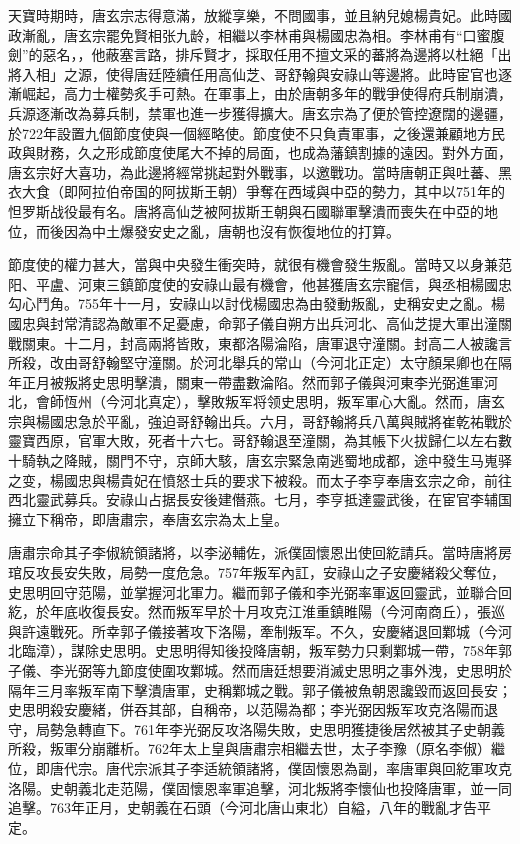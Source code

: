 天寶時期時，唐玄宗志得意滿，放縱享樂，不問國事，並且納兒媳楊貴妃。此時國政漸亂，唐玄宗罷免賢相张九龄，相繼以李林甫與楊國忠為相。李林甫有“口蜜腹劍”的惡名，，他蔽塞言路，排斥賢才，採取任用不擅文采的蕃將為邊將以杜絕「出將入相」之源，使得唐廷陸續任用高仙芝、哥舒翰與安祿山等邊將。此時宦官也逐漸崛起，高力士權勢炙手可熱。在軍事上，由於唐朝多年的戰爭使得府兵制崩潰，兵源逐漸改為募兵制，禁軍也進一步獲得擴大。唐玄宗為了便於管控遼闊的邊疆，於722年設置九個節度使與一個經略使。節度使不只負責軍事，之後還兼顧地方民政與財務，久之形成節度使尾大不掉的局面，也成為藩鎮割據的遠因。對外方面，唐玄宗好大喜功，為此邊將經常挑起對外戰事，以邀戰功。當時唐朝正與吐蕃、黑衣大食（即阿拉伯帝国的阿拔斯王朝）爭奪在西域與中亞的勢力，其中以751年的怛罗斯战役最有名。唐將高仙芝被阿拔斯王朝與石國聯軍擊潰而喪失在中亞的地位，而後因為中土爆發安史之亂，唐朝也沒有恢復地位的打算。

節度使的權力甚大，當與中央發生衝突時，就很有機會發生叛亂。當時又以身兼范阳、平盧、河東三鎮節度使的安祿山最有機會，他甚獲唐玄宗寵信，與丞相楊國忠勾心鬥角。755年十一月，安祿山以討伐楊國忠為由發動叛亂，史稱安史之亂。楊國忠與封常清認為敵軍不足憂慮，命郭子儀自朔方出兵河北、高仙芝提大軍出潼關戰關東。十二月，封高兩將皆敗，東都洛陽淪陷，唐軍退守潼關。封高二人被讒言所殺，改由哥舒翰堅守潼關。於河北舉兵的常山（今河北正定）太守顏杲卿也在隔年正月被叛將史思明擊潰，關東一帶盡數淪陷。然而郭子儀與河東李光弼進軍河北，會師恆州（今河北真定），擊敗叛军将领史思明，叛军軍心大亂。然而，唐玄宗與楊國忠急於平亂，強迫哥舒翰出兵。六月，哥舒翰將兵八萬與賊將崔乾祐戰於靈寶西原，官軍大敗，死者十六七。哥舒翰退至潼關，為其帳下火拔歸仁以左右數十騎執之降賊，關門不守，京師大駭，唐玄宗緊急南逃蜀地成都，途中發生马嵬驿之变，楊國忠與楊貴妃在憤怒士兵的要求下被殺。而太子李亨奉唐玄宗之命，前往西北靈武募兵。安祿山占据長安後建僭燕。七月，李亨抵達靈武後，在宦官李辅国擁立下稱帝，即唐肅宗，奉唐玄宗為太上皇。

唐肅宗命其子李俶統領諸將，以李泌輔佐，派僕固懷恩出使回紇請兵。當時唐將房琯反攻長安失敗，局勢一度危急。757年叛军內訌，安祿山之子安慶緒殺父奪位，史思明回守范陽，並掌握河北軍力。繼而郭子儀和李光弼率軍返回靈武，並聯合回紇，於年底收復長安。然而叛军早於十月攻克江淮重鎮睢陽（今河南商丘），張巡與許遠戰死。所幸郭子儀接著攻下洛陽，牽制叛军。不久，安慶緒退回鄴城（今河北臨漳），謀除史思明。史思明得知後投降唐朝，叛军勢力只剩鄴城一帶，758年郭子儀、李光弼等九節度使圍攻鄴城。然而唐廷想要消滅史思明之事外洩，史思明於隔年三月率叛军南下擊潰唐軍，史稱鄴城之戰。郭子儀被魚朝恩讒毀而返回長安；史思明殺安慶緒，併吞其部，自稱帝，以范陽為都；李光弼因叛军攻克洛陽而退守，局勢急轉直下。761年李光弼反攻洛陽失敗，史思明獲捷後居然被其子史朝義所殺，叛軍分崩離析。762年太上皇與唐肅宗相繼去世，太子李豫（原名李俶）繼位，即唐代宗。唐代宗派其子李适統領諸將，僕固懷恩為副，率唐軍與回紇軍攻克洛陽。史朝義北走范陽，僕固懷恩率軍追擊，河北叛將李懷仙也投降唐軍，並一同追擊。763年正月，史朝義在石頭（今河北唐山東北）自縊，八年的戰亂才告平定。

